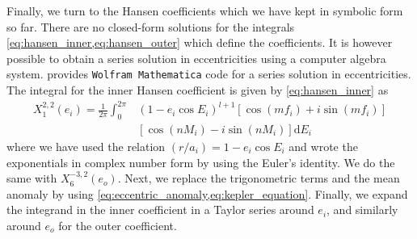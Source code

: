 \documentclass[twoside,openright,titlepage,numbers=noenddot,headinclude,%
                footinclude=true,cleardoublepage=empty,abstractoff, 
                BCOR=5mm,paper=a4,fontsize=11pt,%
                american,%
                ]{scrreprt}%
\begin{document}
Finally, we turn to the Hansen coefficients which we have kept in symbolic 
form so far. There are no closed-form solutions for the integrals 
\cref{eq:hansen_inner,eq:hansen_outer} which define the coefficients. 
It is however possible to obtain a series solution in eccentricities 
using a computer algebra system. 
\Cite{Mardling2013} provides \texttt{Wolfram Mathematica} \citep{Mathematica} code 
for a series solution in eccentricities. The integral
for the inner Hansen coefficient is given by \cref{eq:hansen_inner} as
\begin{equation}
    \begin{aligned}
        X^{2,2}_1(e_i)= \frac{1}{2\pi} \int^{2\pi}_0 &(1-e_i\cos E_i)^{l+1}
        \left[\cos(mf_i)+i\sin(mf_i)\right]\\
        &\left[\cos(nM_i)-i\sin(nM_i)\right]\mathrm{d}E_i
    \end{aligned}
\end{equation}
where we have used the relation $(r/a_i)=1-e_i\cos E_i$ and wrote the 
exponentials in complex number form by using the Euler's identity. We 
do the same with $X^{-3,2}_6(e_o)$. Next, we replace the trigonometric 
terms and the mean anomaly
by using \cref{eq:eccentric_anomaly,eq:kepler_equation}. Finally,
we expand the integrand in the inner coefficient in a Taylor series 
around $e_i$, and similarly around $e_o$ for the outer coefficient.
\end{document}
